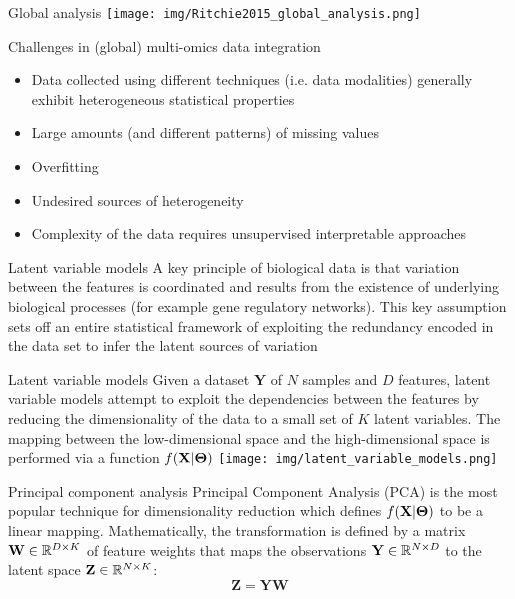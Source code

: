\documentclass[aspectratio=169,notes]{beamer}
\begin{document}
	\begin{frame}{Global analysis}
	\texttt{[image: img/Ritchie2015\_global\_analysis.png]}
	\end{frame}

	\begin{frame}{Challenges in (global) multi-omics data integration}
	\begin{itemize}
		\item Data collected using different techniques (i.e. data modalities) generally exhibit heterogeneous statistical properties
		\item Large amounts (and different patterns) of missing values
		\item Overfitting
		\item Undesired sources of heterogeneity
		\item Complexity of the data requires unsupervised interpretable approaches
	\end{itemize}
	\end{frame}

	\begin{frame}{Latent variable models}
	A key principle of biological data is that variation between the features is coordinated and results from the existence of underlying biological processes (for example gene regulatory networks). This key assumption sets off an entire statistical framework of exploiting the redundancy encoded in the data set to infer the latent sources of variation
	\end{frame}

	\begin{frame}{Latent variable models}
	Given a dataset $\mathbf{Y}$ of $N$ samples and $D$ features, latent variable models attempt to exploit the dependencies between the features by reducing the dimensionality of the data to a small set of $K$ latent variables. The mapping between the low-dimensional space and the high-dimensional space is performed via a function $f({\bf X}|\mbox{\boldmath $\Theta$})$
	\texttt{[image: img/latent\_variable\_models.png]}
	\end{frame}

	\begin{frame}{Principal component analysis}
	Principal Component Analysis (PCA) is the most popular technique for dimensionality reduction \cite{Hotelling1933,Ringner2008} which defines $f({\bf X}|\mbox{\boldmath $\Theta$})$ to be a linear mapping. Mathematically, the transformation is defined by a matrix ${\bf W} \in \mathbb{R}^{D \times K}$ of feature weights that maps the observations ${\bf Y} \in \mathbb{R}^{N \times D}$ to the latent space ${\bf Z} \in \mathbb{R}^{N \times K}$:
	\begin{equation}
		\mathbf{Z} = \mathbf{Y}\mathbf{W}
	\end{equation}
	\end{frame}
\end{document}
